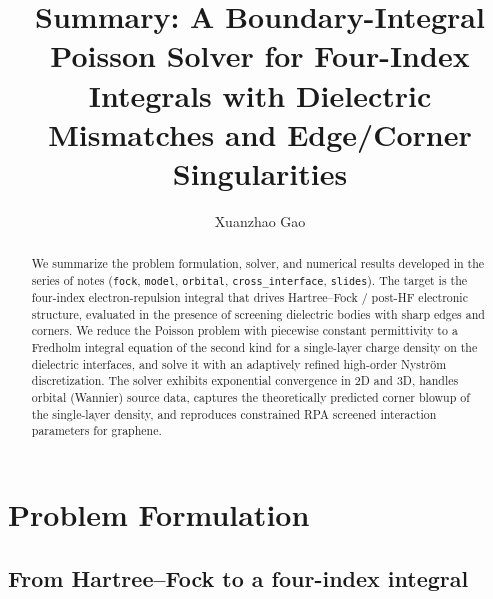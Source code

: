 \documentclass[prb,preprintnumbers,amsmath,amssymb, 10pt]{revtex4}
\begin{document}

\title{Summary: A Boundary-Integral Poisson Solver for Four-Index Integrals
with Dielectric Mismatches and Edge/Corner Singularities}
\author{Xuanzhao Gao}

\begin{abstract}
We summarize the problem formulation, solver, and numerical results developed
in the series of notes (\texttt{fock}, \texttt{model}, \texttt{orbital},
\texttt{cross\_interface}, \texttt{slides}).  The target is the four-index
electron-repulsion integral that drives Hartree--Fock / post-HF electronic
structure, evaluated in the presence of screening dielectric bodies with
sharp edges and corners.  We reduce the Poisson problem with piecewise
constant permittivity to a Fredholm integral equation of the second kind
for a single-layer charge density on the dielectric interfaces, and solve
it with an adaptively refined high-order Nystr\"om discretization.  The
solver exhibits exponential convergence in 2D and 3D, handles orbital
(Wannier) source data, captures the theoretically predicted corner blowup
of the single-layer density, and reproduces constrained RPA screened
interaction parameters for graphene.
\end{abstract}

\maketitle

\section{Problem Formulation}

\subsection{From Hartree--Fock to a four-index integral}
\end{document}
